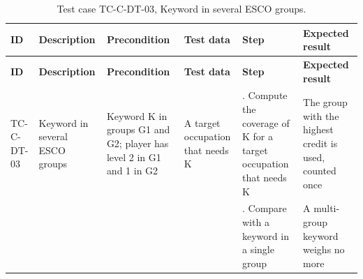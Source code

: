 {\footnotesize{}\renewcommand{\arraystretch}{1.1}
\begin{longtable}{|>{\raggedright\arraybackslash}p{}|>{\raggedright\arraybackslash}p{}|>{\raggedright\arraybackslash}p{}|>{\raggedright\arraybackslash}p{}|>{\raggedright\arraybackslash}p{}|>{\raggedright\arraybackslash}p{}|}
\caption{Test case TC-C-DT-03, Keyword in several ESCO groups.} \\
\hline
\textbf{ID} & \textbf{Description} & \textbf{Precondition} & \textbf{Test data} & \textbf{Step} & \textbf{Expected result} \\ \hline
\endfirsthead
\hline
\textbf{ID} & \textbf{Description} & \textbf{Precondition} & \textbf{Test data} & \textbf{Step} & \textbf{Expected result} \\ \hline
\endhead
TC-C-DT-03 & Keyword in several ESCO groups & Keyword K in groups G1 and G2; player has level 2 in G1 and 1 in G2 & A target occupation that needs K & 1. Compute the coverage of K for a target occupation that needs K & The group with the highest credit is used, counted once \\ \cline{5-6}
 &  &  &  & 2. Compare with a keyword in a single group & A multi-group keyword weighs no more \\ \hline
\end{longtable}
}

